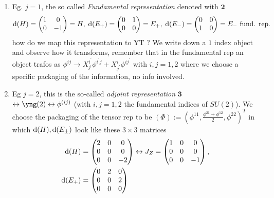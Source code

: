 \begin{enumerate}
\item Eg. $j=1$, the so called \emph{Fundamental representation} denoted with $\mathbf{2}$
\begin{equation*}
	\mathrm{d}(H)=\begin{pmatrix}
		1&0\\
		0&-1\\
	\end{pmatrix}=H, \; \mathrm{d}(E_+)=\begin{pmatrix}
	0&1\\
	0&0\\
\end{pmatrix}=E_+,\;
\mathrm{d}(E_-)=\begin{pmatrix}
	0&0\\
	1&0\\
\end{pmatrix}=E_- \text{ fund. rep}.
\end{equation*}
how do we map this representation to YT ? We write down a $1$ index object and observe how it transforms, remember that in the fundamental rep an object trafos as $\phi^{ij} \rightarrow X^{i^\prime}_j \phi^{i^\prime j} + X^i_{j^\prime} \phi^{i j^\prime}$ with $i,j=1,2$ where we choose a specific packaging of the information, no info involved. 
\item Eg $j=2$, this is the so-called \emph{adjoint representation} $\mathbf{3}$\\
 $\leftrightarrow \yng(2) \leftrightarrow \phi^{(ij)}$ (with $i,j=1,2$ the fundamental indices of $SU(2)$). We choose the packaging of the tensor rep to be $(\Phi):= (\phi^{11},\frac{\phi^{21}+\phi^{12}}{2}, \phi^{22})^T$ in which $\mathrm{d}(H),\mathrm{d}(E_\pm)$ look like these $3\times3$ matrices
 \begin{align*}
 	\mathrm{d}(H) &= \begin{pmatrix}
 		2&0&0\\
 		0&0&0\\
 		0&0&-2\\
 	\end{pmatrix}\leftrightarrow J_Z =\begin{pmatrix}
 	1&0&0\\
 	0&0&0\\
 	0&0&-1\\
 \end{pmatrix},\\
\mathrm{d}(E_+) &= \begin{pmatrix}
	0&2&0\\ 0&0&2\\0&0&0\\

\end{pmatrix}
\end{align*}
\end{enumerate}
